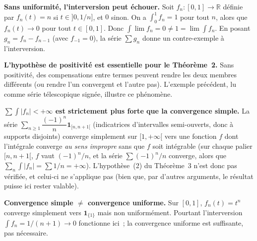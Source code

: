 \vspace{6pt}

\begin{mdframed}[style=cexbar]
  \textbf{Sans uniformité, l'interversion peut échouer.}\enspace%
  Soit $f_n : [0,1] \to \mathbb{R}$ définie par $f_n(t) = n$ si
  $t\in{]0,1/n]}$, et $0$ sinon. On a $\int_0^1 f_n = 1$ pour tout $n$,
  alors que $f_n(t) \to 0$ pour tout $t \in [0,1]$. Donc
  $\int \lim f_n = 0 \neq 1 = \lim \int f_n$.
  En posant $g_n = f_n - f_{n-1}$ (avec $f_{-1}=0$), la série $\sum g_n$
  donne un contre-exemple à l'interversion.

  \smallskip\noindent
  \textbf{L'hypothèse de positivité est essentielle pour le Théorème~2.}\enspace%
  Sans positivité, des compensations entre termes peuvent rendre les
  deux membres différents (ou rendre l'un convergent et l'autre pas).
  L'exemple précédent, lu comme série télescopique signée, illustre
  ce phénomène.

  \smallskip\noindent
  \textbf{$\sum\int |f_n| < +\infty$ est strictement plus forte que la
  convergence simple.}\enspace%
  La série $\sum_{n\geq 1}\dfrac{{(-1)}^n}{n}\mathbf{1}_{[n,n+1[}$
  (indicatrices d'intervalles semi-ouverts, donc à supports disjoints)
  converge simplement sur $[1,+\infty[$ vers une fonction $f$ dont l'intégrale
  converge \emph{au sens impropre} sans que $f$ soit intégrable (sur chaque
  palier $[n,n+1[$, $f$ vaut $(-1)^n/n$, et la série $\sum (-1)^n/n$ converge,
  alors que $\sum_n\int |f_n| = \sum 1/n = +\infty$). L'hypothèse~(2) du
  Théorème~3 n'est donc pas vérifiée, et celui-ci ne s'applique pas (bien que,
  par d'autres arguments, le résultat puisse ici rester valable).

  \smallskip\noindent
  \textbf{Convergence simple $\neq$ convergence uniforme.}\enspace%
  Sur $[0,1]$, $f_n(t) = t^n$ converge simplement vers $\mathbf{1}_{\{1\}}$
  mais non uniformément. Pourtant l'interversion $\int f_n = 1/(n+1)\to 0$
  fonctionne ici~; la convergence uniforme est suffisante, pas nécessaire.
\end{mdframed}

\vspace{6pt}
\exolabel

